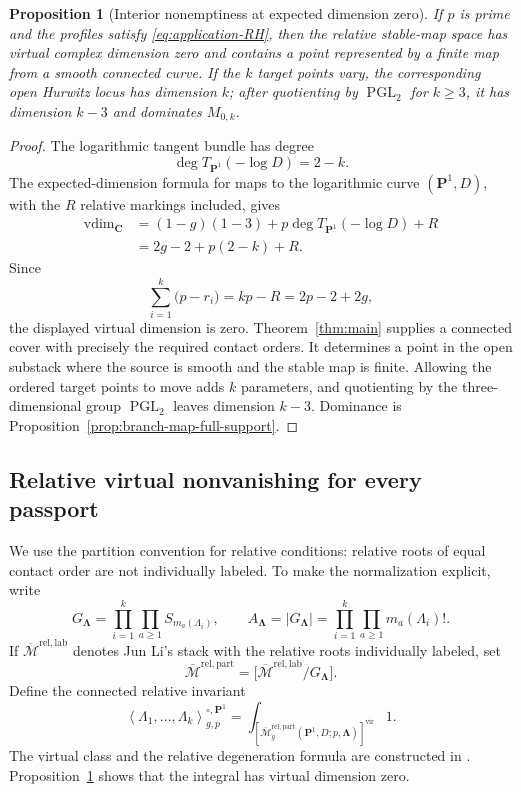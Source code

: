 \documentclass[11pt]{amsart}
\theoremstyle{plain}
\newtheorem{proposition}[theorem]{Proposition}
\theoremstyle{definition}
\numberwithin{equation}{section}
\begin{document}
\begin{proposition}[Interior nonemptiness at expected dimension zero]
\label{prop:relative-interior}
If $p$ is prime and the profiles satisfy
\eqref{eq:application-RH}, then the relative stable-map space has virtual
complex dimension zero and contains a point represented by a finite map
from a smooth connected curve.  If the $k$ target points vary, the
corresponding open Hurwitz locus has dimension $k$; after quotienting by
$\operatorname{PGL}_2$ for $k\geq3$, it has dimension $k-3$ and dominates
$M_{0,k}$.
\end{proposition}

\begin{proof}
The logarithmic tangent bundle has degree
\[
 \deg T_{\mathbf P^1}(-\log D)=2-k.
\]
The expected-dimension formula for maps to the logarithmic curve
$(\mathbf P^1,D)$, with the $R$ relative markings included, gives
\begin{align*}
 \operatorname{vdim}_{\mathbf C}
 &= (1-g)(1-3)+p\deg T_{\mathbf P^1}(-\log D)+R\\
 &=2g-2+p(2-k)+R.
\end{align*}
Since
\[
 \sum_{i=1}^k\bigl(p-r_i\bigr)=kp-R=2p-2+2g,
\]
the displayed virtual dimension is zero.  Theorem~\ref{thm:main} supplies a
connected cover with precisely the required contact orders.  It determines
a point in the open substack where the source is smooth and the stable map
is finite.  Allowing the ordered target points to move adds $k$ parameters,
and quotienting by the three-dimensional group $\operatorname{PGL}_2$
leaves dimension $k-3$.  Dominance is
Proposition~\ref{prop:branch-map-full-support}.
\end{proof}

\subsection{Relative virtual nonvanishing for every passport}

We use the partition convention for relative conditions: relative roots of
equal contact order are not individually labeled.  To make the
normalization explicit, write
\[
 G_{\boldsymbol\Lambda}
 =\prod_{i=1}^k\prod_{a\geq1}S_{m_a(\Lambda_i)},
 \qquad
 A_{\boldsymbol\Lambda}=|G_{\boldsymbol\Lambda}|
 =\prod_{i=1}^k\prod_{a\geq1}m_a(\Lambda_i)!.
\]
If $\overline{\mathcal M}^{\mathrm{rel,lab}}$ denotes Jun Li's stack with
the relative roots individually labeled, set
\[
 \overline{\mathcal M}^{\mathrm{rel,part}}
 =\bigl[\overline{\mathcal M}^{\mathrm{rel,lab}}/
        G_{\boldsymbol\Lambda}\bigr].
\]
Define the connected relative invariant
\begin{equation}\label{eq:relative-invariant-definition}
 \left\langle\Lambda_1,\ldots,\Lambda_k
 \right\rangle^{\circ,\mathbf P^1}_{g,p}
 =\int_{[\overline{\mathcal M}^{\mathrm{rel,part}}_{g}
   (\mathbf P^1,D;p,\boldsymbol\Lambda)]^{\mathrm{vir}}}1.
\end{equation}
The virtual class and the relative degeneration formula are constructed in
\cite{JunLiDegeneration}.  Proposition~\ref{prop:relative-interior} shows
that the integral has virtual dimension zero.
\end{document}
